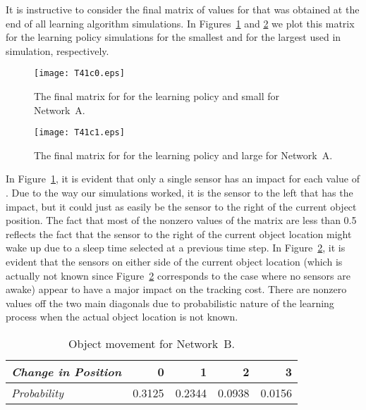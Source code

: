 \documentclass[journal,draftcls,onecolumn,11pt]{IEEEtran}
\newcommand{\QMDP}{}
\begin{document}
It is instructive to consider the final matrix of values for  that was obtained at the end of all learning algorithm simulations.  In Figures~\ref{fig:T41c0} and \ref{fig:T41c1} we plot this matrix for the \QMDP{} learning policy simulations for the smallest  and for the largest  used in simulation, respectively.
\begin{figure}
   \begin{center}
      \texttt{[image: T41c0.eps]}
      \caption{The final matrix for  for the \QMDP{} learning policy and small  for Network~A. \label{fig:T41c0}}
   \end{center}
\end{figure}
\begin{figure}
   \begin{center}
      \texttt{[image: T41c1.eps]}
      \caption{The final matrix for  for the \QMDP{} learning policy and large  for Network~A. \label{fig:T41c1}}
   \end{center}
\end{figure}
In Figure~\ref{fig:T41c0}, it is evident that only a single sensor has an impact for each value of .  Due to the way our simulations worked, it is the sensor to the left that has the impact, but it could just as easily be the sensor to the right of the current object position. The fact that most of the nonzero values of the matrix are less than 0.5 reflects the fact that the sensor to the right of the current object location might wake up due to a sleep time selected at a previous time step.  In Figure~\ref{fig:T41c1}, it is evident that the sensors on either side of the current object location (which is actually not known since Figure~\ref{fig:T41c1} corresponds to the case where no sensors are awake) appear to have a major impact on the tracking cost.  There are nonzero values off the two main diagonals due to probabilistic nature of the learning process when the actual object location is not known.

\begin{table}
   \begin{center}
      \caption{Object movement for Network~B. \label{tab:moves}}
      \begin{tabular}{|l|r|r|r|r|}
         \hline
         {\em Change in Position} & 0 & 1 & 2 & 3  \\ \hline
         {\em Probability} & 0.3125 & 0.2344 & 0.0938 & 0.0156 \\ \hline
      \end{tabular}
   \end{center}
\end{table}
\end{document}
